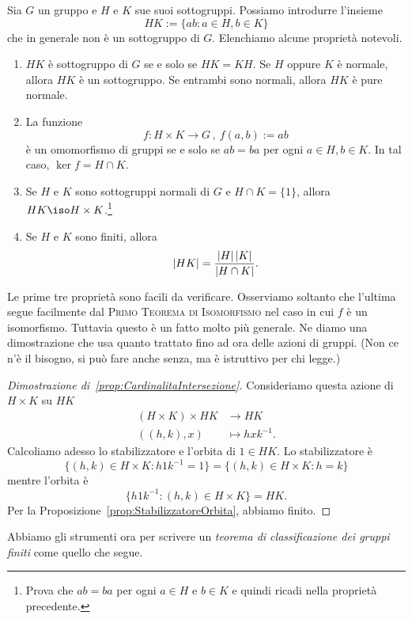 \begin{rich}\label{rich:ProdottoSottogruppi}
Sia $G$ un gruppo e $H$ e $K$ sue suoi sottogruppi. Possiamo introdurre l'insieme
\[HK := \{ab :  a \in H, b \in K\}\]
che in generale non è un sottogruppo di $G$. Elenchiamo alcune proprietà notevoli.
\begin{enumerate}
\item $HK$ è sottogruppo di $G$ se e solo se $HK=KH$. Se $H$ oppure $K$ è normale, allora $HK$ è un sottogruppo. Se entrambi sono normali, allora $HK$ è pure normale.
\item La funzione
\[f : H \times K \to G \,,\ f(a,b) := ab\]
è un omomorfismo di gruppi se e solo se $ab=ba$ per ogni $a \in H, b \in K$. In tal caso, $\ker f = H\cap K$.
\item Se $H $ e $K$ sono sottogruppi normali di $G$ e $H \cap K=\{1\}$, allora $HK \iso H \times K$.\footnote{Prova che $ab = ba$ per ogni $a \in H$ e $b \in K$ e quindi ricadi nella proprietà precedente.}
\item %
Se $H$ e $K$ sono finiti, allora
\[ \left\lvert HK\right\rvert=\frac{\left\lvert H\right\rvert\left\lvert K\right\rvert}{\left\lvert H\cap K\right\rvert}. \]
\end{enumerate}
Le prime tre proprietà sono facili da verificare. Osserviamo soltanto che l'ultima segue facilmente dal {\scshape Primo Teorema di Isomorfismo} nel caso in cui $f$ è un isomorfismo. Tuttavia questo è un fatto molto più generale. Ne diamo una dimostrazione che usa quanto trattato fino ad ora delle azioni di gruppi. (Non ce n'è il bisogno, si può fare anche senza, ma è istruttivo per chi legge.)
%
\begin{proof}[Dimostrazione di~\ref{prop:CardinalitaIntersezione}]
Consideriamo questa azione di $H \times K$ su $HK$
\[\begin{aligned}
(H \times K) \times HK &\to HK \\ 
((h, k), x) &\mapsto hxk^{-1} .
\end{aligned}\]
Calcoliamo adesso lo stabilizzatore e l'orbita di $1 \in HK$. Lo stabilizzatore è
\[\{(h, k) \in H \times K :  h 1 k^{-1} = 1\} = \{(h, k) \in H \times K :  h = k\}\]
mentre l'orbita è
\[\{h 1 k^{-1} : (h, k) \in H \times K\} = HK .\]
Per la Proposizione~\ref{prop:StabilizzatoreOrbita}, abbiamo finito.
\end{proof}
\end{rich}

Abbiamo gli strumenti ora per scrivere un {\em teorema di classificazione dei gruppi finiti} come quello che segue.

